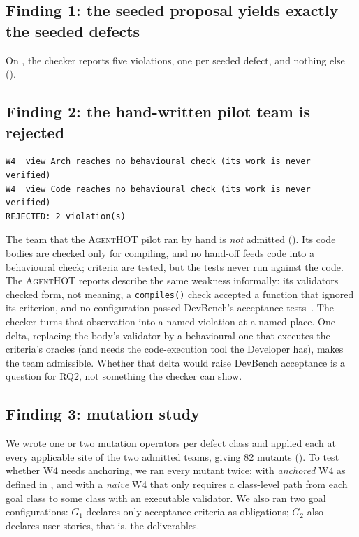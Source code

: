 \documentclass[10pt,a4paper]{article}
\newcommand{\tool}{\textsc{AgentHOT}}
\newcommand{\W}[1]{\textsf{W#1}}
\newcommand{\code}[1]{\texttt{#1}}
\newcommand{\file}[1]{\texttt{#1}}
\begin{document}
\subsection{Finding 1: the seeded proposal yields exactly the seeded defects}

On , the checker reports five violations, one per
seeded defect, and nothing else ().

\subsection{Finding 2: the hand-written pilot team is rejected}

\begin{lstlisting}[style=engine, caption={Checker output on \file{teams/chakin_pilot.json}, our encoding of the hand-written \tool{} pilot team.}, label={lst:pilot}]
W4  view Arch reaches no behavioural check (its work is never verified)
W4  view Code reaches no behavioural check (its work is never verified)
REJECTED: 2 violation(s)
\end{lstlisting}

The team that the \tool{} pilot ran by hand is \emph{not} admitted
(). Its code bodies are checked only for compiling, and no
hand-off feeds code into a behavioural check; criteria are tested, but the
tests never run against the code. The \tool{} reports describe the same
weakness informally: its validators checked form, not meaning, a
\code{compiles()} check accepted a function that ignored its criterion, and
no configuration passed DevBench's acceptance tests~\cite{agenthot2026}.
The checker turns that observation into a named violation at a named place.
One delta, replacing the body's validator by a behavioural one that
executes the criteria's oracles (and needs the code-execution tool the
Developer has), makes the team admissible. Whether that delta would raise
DevBench acceptance is a question for RQ2, not something the checker can
show.

\subsection{Finding 3: mutation study}

We wrote one or two mutation operators per defect class and applied each
at every applicable site of the two admitted teams, giving 82 mutants
(). To test whether \W{4} needs anchoring, we ran
every mutant twice: with \emph{anchored} \W{4} as defined in
, and with a \emph{naive} \W{4} that only requires a
class-level path from each goal class to some class with an executable
validator. We also ran two goal configurations: $G_1$ declares only
acceptance criteria as obligations; $G_2$ also declares user stories, that
is, the deliverables.
\end{document}
